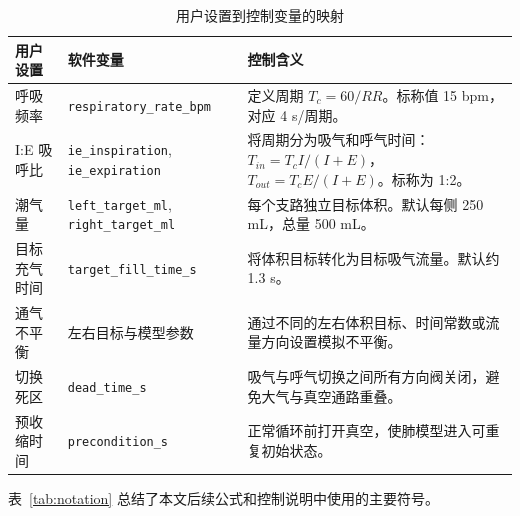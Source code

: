 \documentclass[UTF8,11pt,a4paper]{ctexart}
\begin{document}
\begin{table}[H]
\centering
\caption{用户设置到控制变量的映射}
\label{tab:param-map}
\small
\begin{tabularx}{\textwidth}{
  >{\raggedright\arraybackslash}p{3.5cm}
  >{\raggedright\arraybackslash}p{4.6cm}
  X
}
\toprule
\textbf{用户设置} & \textbf{软件变量} & \textbf{控制含义} \\
\midrule
呼吸频率 & \texttt{respiratory\_rate\_bpm} & 定义周期 $T_c=60/RR$。标称值 15 bpm，对应 4 s/周期。 \\
I:E 吸呼比 & \texttt{ie\_inspiration}, \texttt{ie\_expiration} & 将周期分为吸气和呼气时间：$T_{in}=T_c I/(I+E)$，$T_{out}=T_c E/(I+E)$。标称为 1:2。 \\
潮气量 & \texttt{left\_target\_ml}, \texttt{right\_target\_ml} & 每个支路独立目标体积。默认每侧 250 mL，总量 500 mL。 \\
目标充气时间 & \texttt{target\_fill\_time\_s} & 将体积目标转化为目标吸气流量。默认约 1.3 s。 \\
通气不平衡 & 左右目标与模型参数 & 通过不同的左右体积目标、时间常数或流量方向设置模拟不平衡。 \\
切换死区 & \texttt{dead\_time\_s} & 吸气与呼气切换之间所有方向阀关闭，避免大气与真空通路重叠。 \\
预收缩时间 & \texttt{precondition\_s} & 正常循环前打开真空，使肺模型进入可重复初始状态。 \\
\bottomrule
\end{tabularx}
\end{table}

表~\ref{tab:notation} 总结了本文后续公式和控制说明中使用的主要符号。
\end{document}
